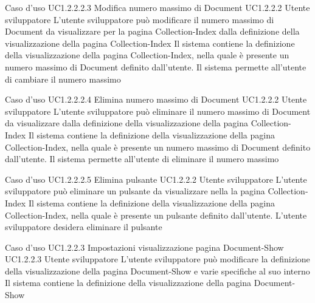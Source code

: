 \UCtitle
{Caso d'uso UC1.2.2.2.3}
{Modifica numero massimo di Document}
\UC
{UC1.2.2.2}
{Utente sviluppatore}
{L'utente sviluppatore  può modificare il numero massimo di Document da visualizzare per la pagina Collection-Index dalla definizione della visualizzazione della pagina Collection-Index}
{Il sistema contiene la definizione della visualizzazione della pagina Collection-Index, nella quale è presente un numero massimo di Document definito dall'utente. Il sistema permette all'utente di cambiare il numero massimo}

\UCtitle
{Caso d'uso UC1.2.2.2.4}
{Elimina numero massimo di Document}
\UC
{UC1.2.2.2}
{Utente sviluppatore}
{L'utente sviluppatore  può eliminare il numero massimo di Document da visualizzare dalla definizione della visualizzazione della pagina Collection-Index}
{Il sistema contiene la definizione della visualizzazione della pagina Collection-Index, nella quale è presente un numero massimo di Document definito dall'utente. Il sistema permette all'utente di eliminare il numero massimo}

\UCtitle
{Caso d'uso UC1.2.2.2.5}
{Elimina pulsante}
\UC
{UC1.2.2.2}
{Utente sviluppatore}
{L'utente sviluppatore  può eliminare un pulsante da visualizzare nella la pagina Collection-Index}
{Il sistema contiene la definizione della visualizzazione della pagina Collection-Index, nella quale è presente un pulsante definito dall'utente. L'utente sviluppatore desidera eliminare il pulsante}


\UCtitle
{Caso d'uso UC1.2.2.3}
{Impostazioni visualizzazione pagina Document-Show}
\UC
{UC1.2.2.3}
{Utente sviluppatore}
{L'utente sviluppatore  può modificare la definizione della visualizzazione della pagina Document-Show e varie specifiche al suo interno}
{Il sistema contiene la definizione della visualizzazione della pagina Document-Show}


